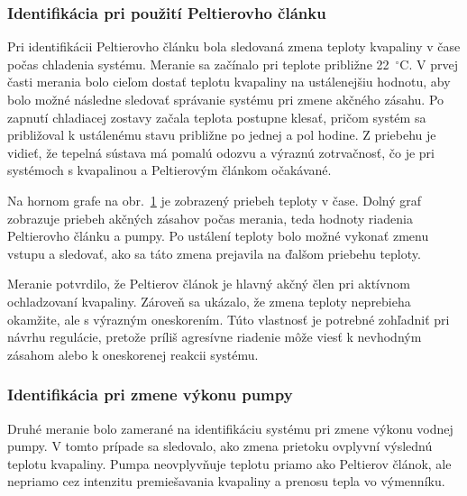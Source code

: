 \subsubsection{Identifikácia pri použití Peltierovho článku}

Pri identifikácii Peltierovho článku bola sledovaná zmena teploty kvapaliny v čase počas chladenia systému. Meranie sa začínalo pri teplote približne 22~$^\circ$C. V prvej časti merania bolo cieľom dostať teplotu kvapaliny na ustálenejšiu hodnotu, aby bolo možné následne sledovať správanie systému pri zmene akčného zásahu. Po zapnutí chladiacej zostavy začala teplota postupne klesať, pričom systém sa približoval k ustálenému stavu približne po jednej a pol hodine. Z priebehu je vidieť, že tepelná sústava má pomalú odozvu a výraznú zotrvačnosť, čo je pri systémoch s kvapalinou a Peltierovým článkom očakávané.

Na hornom grafe na obr.~\ref{fig:identifikacia_peltier} je zobrazený priebeh teploty v čase. Dolný graf zobrazuje priebeh akčných zásahov počas merania, teda hodnoty riadenia Peltierovho článku a pumpy. Po ustálení teploty bolo možné vykonať zmenu vstupu a sledovať, ako sa táto zmena prejavila na ďalšom priebehu teploty.

\begin{figure}[H]
    \centering
    \label{fig:identifikacia_peltier}
\end{figure}

Meranie potvrdilo, že Peltierov článok je hlavný akčný člen pri aktívnom ochladzovaní 
kvapaliny. Zároveň sa ukázalo, že zmena teploty neprebieha okamžite, ale s výrazným 
oneskorením. Túto vlastnosť je potrebné zohľadniť pri návrhu regulácie, pretože príliš 
agresívne riadenie môže viesť k nevhodným zásahom alebo k oneskorenej reakcii systému.

\subsubsection{Identifikácia pri zmene výkonu pumpy}

Druhé meranie bolo zamerané na identifikáciu systému pri zmene výkonu vodnej pumpy. 
V tomto prípade sa sledovalo, ako zmena prietoku ovplyvní výslednú teplotu kvapaliny. 
Pumpa neovplyvňuje teplotu priamo ako Peltierov článok, ale nepriamo cez intenzitu 
premiešavania kvapaliny a prenosu tepla vo výmenníku.

